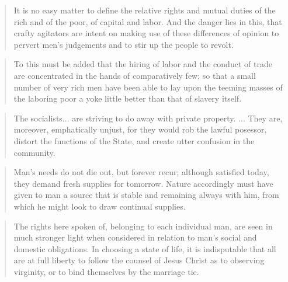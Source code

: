 \begin{quote}
  It is no easy matter to define the relative rights and mutual duties of the rich and of the poor, of capital and labor. And the danger lies in this, that crafty agitators are intent on making use of these differences of opinion to pervert men's judgements and to stir up the people to revolt.
\end{quote}

\begin{quote}
  To this must be added that the hiring of labor and the conduct of trade are concentrated in the hands of comparatively few; so that a small number of very rich men have been able to lay upon the teeming masses of the laboring poor a yoke little better than that of slavery itself.
\end{quote}

\begin{quote}
  The socialists... are striving to do away with private property. ... They are, moreover, emphatically unjust, for they would rob the lawful posessor, distort the functions of the State, and create utter confusion in the community.
\end{quote}

\begin{quote}
  Man's needs do not die out, but forever recur; although satisfied today, they demand fresh supplies for tomorrow. Nature accordingly must have given to man a source that is stable and remaining always with him, from which he might look to draw continual supplies.
\end{quote}

\begin{quote}
 The rights here spoken of, belonging to each individual man, are seen in much stronger light when considered in relation to man's social and domestic obligations. In choosing a state of life, it is indisputable that all are at full liberty to follow the counsel of Jesus Christ as to observing virginity, or to bind themselves by the marriage tie.
\end{quote}

